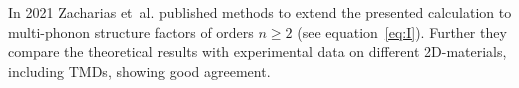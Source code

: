 In 2021 Zacharias et~al. published methods to extend the presented calculation to multi-phonon structure factors of orders $n\geq 2$ (see equation~\ref{eq:I}).
Further they compare the theoretical results with experimental data on different 2D-materials, including \acp{TMD}, showing good agreement\cite{zacharias2021a,zacharias2021b}.

